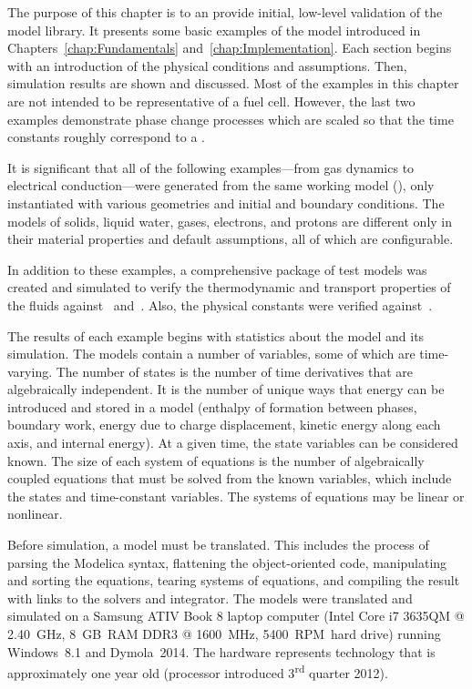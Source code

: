 \glsresetall


The purpose of this chapter is to an provide initial, low-level validation of the model library.  It presents some basic examples of the model introduced in Chapters~\ref{chap:Fundamentals} and~\ref{chap:Implementation}.  Each section begins with an introduction of the physical conditions and assumptions.  Then, simulation results are shown and discussed.  Most of the examples in this chapter are not intended to be representative of a fuel cell.  However, the last two examples demonstrate phase change processes which are scaled so that the time constants roughly correspond to a .

It is significant that all of the following examples---from gas dynamics to electrical con\-duction---were generated from the same working model (), only instantiated with various geometries and initial and boundary conditions.  The models of solids, liquid water, gases, electrons, and protons are different only in their material properties and default assumptions, all of which are configurable.

In addition to these examples, a comprehensive package of test models was created and simulated  to verify the thermodynamic and transport properties of the fluids against~\cite{Moran2004} and~\cite{Incropera2002}.  Also, the physical constants were verified against~\cite{NIST2010}.

The results of each example begins with statistics about the model and its simulation.  The models contain a number of variables, some of which are time-varying.  The number of states is the number of time derivatives that are algebraically independent.  It is the number of unique ways that energy can be introduced and stored in a model (enthalpy of formation between phases, boundary work, energy due to charge displacement, kinetic energy along each axis, and internal energy).  At a given time, the state variables can be considered known.  The size of each system of equations is the number of algebraically coupled equations that must be solved from the known variables, which include the states and time-constant variables.  The systems of equations may be linear or nonlinear.

Before simulation, a model must be translated.  This includes the process of parsing the Modelica syntax, flattening the object-oriented code, manipulating and sorting the equations, tearing systems of equations, and compiling the result with links to the solvers and integrator.  The models were translated and simulated on a Samsung ATIV Book 8 laptop computer (Intel Core i7 3635QM @ \SI{2.40}{GHz}, \SI{8}{GB}~RAM DDR3 @ \SI{1600}{MHz}, \SI{5400}{RPM}~hard drive) running Windows~8.1 and Dymola~2014.  The hardware represents technology that is approximately one year old (processor introduced 3\textsuperscript{rd} quarter 2012). 

